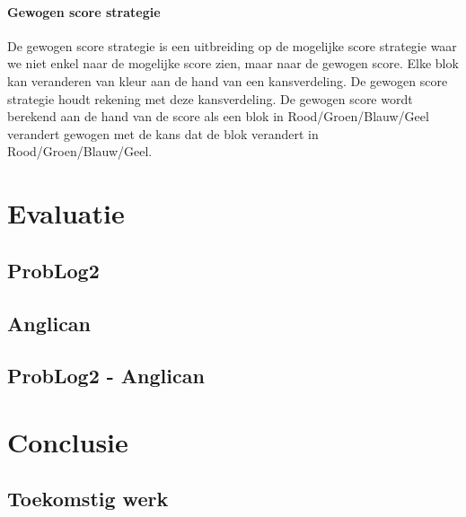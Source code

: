 \documentclass[12pt,a4paper,oneside]{book}
\theoremstyle{definition}
\begin{document}
\subsubsection{Gewogen score strategie}
De gewogen score strategie is een uitbreiding op de mogelijke score strategie waar we niet enkel naar de mogelijke score zien, maar naar de gewogen score. Elke blok kan veranderen van kleur aan de hand van een kansverdeling. De gewogen score strategie houdt rekening met deze kansverdeling. De gewogen score wordt berekend aan de hand van de score als een blok in Rood/Groen/Blauw/Geel verandert gewogen met de kans dat de blok verandert in Rood/Groen/Blauw/Geel.

\chapter{Evaluatie}
\section{ProbLog2}
\section{Anglican}
\section{ProbLog2 - Anglican}

\chapter{Conclusie}
\section{Toekomstig werk}



\end{document}
